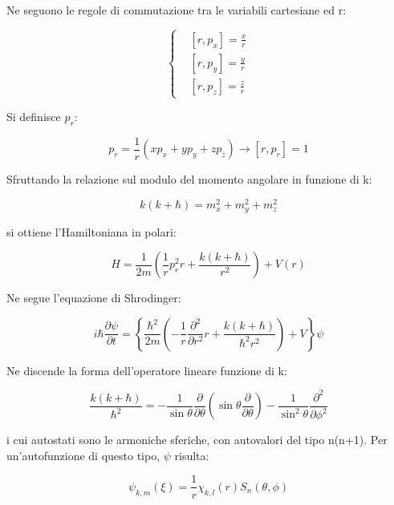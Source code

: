 \documentclass{article}
\begin{document}
Ne seguono le regole di commutazione tra le variabili cartesiane ed r:

\begin{equation}
    \left\{
    \begin{aligned}
         & [r, p_x]=\frac{x}{r} \\
         & [r, p_y]=\frac{y}{r} \\
         & [r, p_z]=\frac{z}{r}
    \end{aligned}
    \right.
\end{equation}

Si definisce $p_r$:

\begin{equation}
    p_r=\frac{1}{r}(xp_x+yp_y+zp_z) \rightarrow [r, p_r]=1
\end{equation}

Sfruttando la relazione sul modulo del momento angolare in funzione di k:

\begin{equation}
    k(k+\hbar)=m_x^2+m_y^2+m_z^2
\end{equation}

si ottiene l'Hamiltoniana in polari:

\begin{equation}
    H=\frac{1}{2m}\left ( \frac{1}{r}p_r^2 r +\frac{k(k+\hbar)}{r^2}\right )+V(r)
\end{equation}

Ne segue l'equazione di Shrodinger:

\begin{equation}
    i\hbar \frac{\partial \psi}{\partial t}= \left \{ \frac{\hbar^2}{2m}\left ( -\frac{1}{r}\frac{\partial^2}{\partial r^2}r+\frac{k(k+\hbar)}{\hbar^2r^2} \right ) +V \right \} \psi
\end{equation}

Ne discende la forma dell'operatore lineare funzione di k:

\begin{equation}
    \frac{k(k+\hbar)}{\hbar^2}= -\frac{1}{\sin{\theta}}\frac{\partial}{\partial \theta}\left ( \sin{\theta}\frac{\partial}{\partial \theta} \right ) - \frac{1}{\sin^2{\theta}}\frac{\partial^2}{\partial \phi^2}
\end{equation}

i cui autostati sono le armoniche sferiche, con autovalori del tipo n(n+1). Per un'autofunzione di questo tipo, $\psi$ risulta:

\begin{equation}
    \psi_{k,m}(\xi)=\frac{1}{r}\chi_{k,l}(r)S_n(\theta, \phi)
\end{equation}
\end{document}
